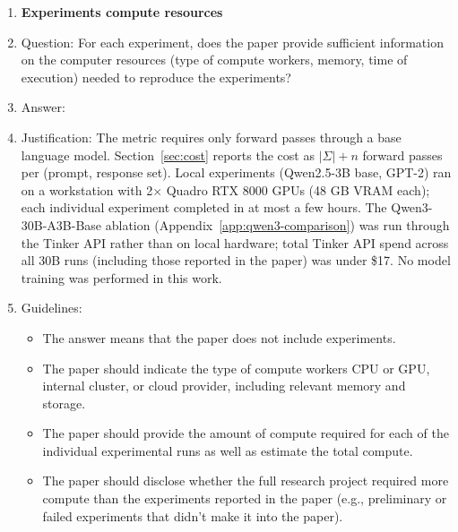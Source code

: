 \begin{enumerate}
\item {\bf Experiments compute resources}
    \item[] Question: For each experiment, does the paper provide sufficient information on the computer resources (type of compute workers, memory, time of execution) needed to reproduce the experiments?
    \item[] Answer: \answerYes{}
    \item[] Justification: The metric requires only forward passes through a base language model. Section~\ref{sec:cost} reports the cost as $|\Sigma|+n$ forward passes per (prompt, response set). Local experiments (Qwen2.5-3B base, GPT-2) ran on a workstation with 2$\times$ Quadro RTX 8000 GPUs (48 GB VRAM each); each individual experiment completed in at most a few hours. The Qwen3-30B-A3B-Base ablation (Appendix~\ref{app:qwen3-comparison}) was run through the Tinker API rather than on local hardware; total Tinker API spend across all 30B runs (including those reported in the paper) was under \$17. No model training was performed in this work.
    \item[] Guidelines:
    \begin{itemize}
        \item The answer \answerNA{} means that the paper does not include experiments.
        \item The paper should indicate the type of compute workers CPU or GPU, internal cluster, or cloud provider, including relevant memory and storage.
        \item The paper should provide the amount of compute required for each of the individual experimental runs as well as estimate the total compute.
        \item The paper should disclose whether the full research project required more compute than the experiments reported in the paper (e.g., preliminary or failed experiments that didn't make it into the paper).
    \end{itemize}


\end{enumerate}
